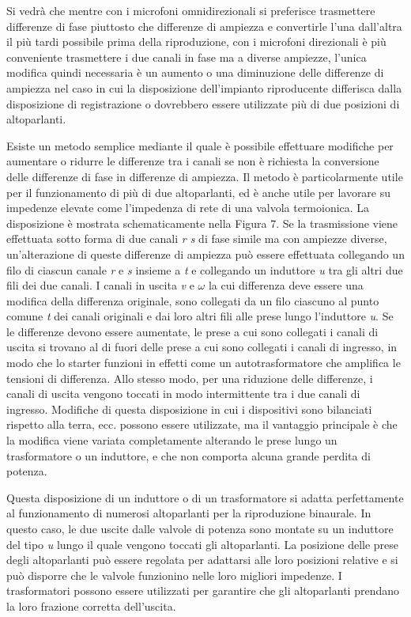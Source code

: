 \documentclass[11pt]{article}
\begin{document}
\begin{multicols*}{2}
Si vedrà che mentre con i microfoni omnidirezionali si preferisce trasmettere differenze di fase piuttosto che differenze di ampiezza e convertirle l'una dall'altra il più tardi possibile prima della riproduzione, con i microfoni direzionali è più conveniente trasmettere i due canali in fase ma a diverse ampiezze, l'unica modifica quindi necessaria è un aumento o una diminuzione delle differenze di ampiezza nel caso in cui la disposizione dell’impianto riproducente differisca dalla disposizione di registrazione o dovrebbero essere utilizzate più di due posizioni di altoparlanti.

Esiste un metodo semplice mediante il quale è possibile effettuare modifiche per aumentare o ridurre le differenze tra i canali se non è richiesta la conversione delle differenze di fase in differenze di ampiezza. Il metodo è particolarmente utile per il funzionamento di più di due altoparlanti, ed è anche utile per lavorare su impedenze elevate come l'impedenza di rete di una valvola termoionica. La disposizione è mostrata schematicamente nella Figura 7. Se la trasmissione viene effettuata sotto forma di due canali \textit{r s} di fase simile ma con ampiezze diverse, un'alterazione di queste differenze di ampiezza può essere effettuata collegando un filo di ciascun canale \textit{r} e \textit{s} insieme a \textit{t} e collegando un induttore \textit{u} tra gli altri due fili dei due canali. I canali in uscita \textit{v} e $\omega$ la cui differenza deve essere una modifica della differenza originale, sono collegati da un filo ciascuno al punto comune \textit{t} dei canali originali e dai loro altri fili alle prese lungo l’induttore \textit{u}. Se le differenze devono essere aumentate, le prese a cui sono collegati i canali di uscita si trovano al di fuori delle prese a cui sono collegati i canali di ingresso, in modo che lo starter funzioni in effetti come un autotrasformatore che amplifica le tensioni di differenza. Allo stesso modo, per una riduzione delle differenze, i canali di uscita vengono toccati in modo intermittente tra i due canali di ingresso. Modifiche di questa disposizione in cui i dispositivi sono bilanciati rispetto alla terra, ecc. possono essere utilizzate, ma il vantaggio principale è che la modifica viene variata completamente alterando le prese lungo un trasformatore o un induttore, e che non comporta alcuna grande perdita di potenza.

Questa disposizione di un induttore o di un trasformatore si adatta perfettamente al funzionamento di numerosi altoparlanti per la riproduzione binaurale. In questo caso, le due uscite dalle valvole di potenza sono montate su un induttore del tipo \textit{u} lungo il quale vengono toccati gli altoparlanti. La posizione delle prese degli altoparlanti può essere regolata per adattarsi alle loro posizioni relative e si può disporre che le valvole funzionino nelle loro migliori impedenze. I trasformatori possono essere utilizzati per garantire che gli altoparlanti prendano la loro frazione corretta dell’uscita.


\end{multicols*}
\end{document}
